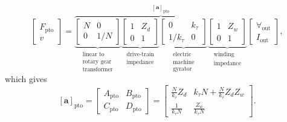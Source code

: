 \documentclass[twocolumn]{autart}
\begin{document}
\begin{equation}
 	\label{eq:Z_cascade_to_ABCD}
 	\begin{bmatrix} 
 		F_{\textrm{pto}} \\
 		v 
 	\end{bmatrix} 
 	\! = \!
        \overbrace{
 	\underbrace{
        \begin{bmatrix} 
                N & 0 \\ 
                0 & 1/N 
        \end{bmatrix}
        }_{\substack{\text{linear to} \\ \text{rotary gear} \\ \text{transformer}}}
        \underbrace{
  	\begin{bmatrix} 
	 	1 & Z_d \\ 
 		0 & 1 
	\end{bmatrix}
        }_{\substack{\text{drive-train} \\ \text{impedance}}}
        \underbrace{
   	\begin{bmatrix} 
	 	0 & k_{\tau} \\ 
	 	1/k_{\tau} & 0 
        \end{bmatrix}
        }_{\substack{\text{electric} \\ \text{machine} \\ \text{gyrator}}}
        \underbrace{
   	\begin{bmatrix} 
	 	1 & Z_w \\ 
	 	0 & 1 
	\end{bmatrix}
        }_{\substack{\text{winding} \\ \text{impedance}}}
        }^{\left[ \mathbf{a} \right]_{\textrm{pto}}}
 	\begin{bmatrix} 
 		\forall_{\textrm{out}} \\
 		I_{\textrm{out}} 
 	\end{bmatrix} \!, 
\end{equation}
%
which gives
%
\begin{equation}
        \left[ \mathbf{a} \right]_{\textrm{pto}}
	= 
	\begin{bmatrix} 
		A_{\textrm{pto}} & B_{\textrm{pto}} \\ 
		C_{\textrm{pto}} & D_{\textrm{pto}} 
	\end{bmatrix}
	=
	\begin{bmatrix} 
		\frac{N}{k_{\tau}}  Z_d & k_\tau N +\frac{N}{k_{\tau}}  Z_dZ_w  \\
		\frac{1}{k_{\tau}N}     & \frac{Z_w}{k_{\tau}N} 
	\end{bmatrix}.
	\label{eq:pto_abcd}
\end{equation}
\end{document}
